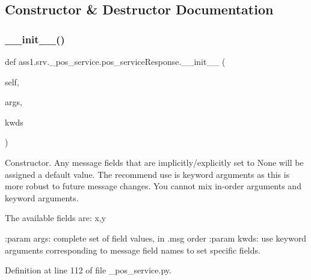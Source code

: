 \subsection{Constructor \& Destructor Documentation}
\mbox{\label{classass1_1_1srv_1_1__pos__service_1_1pos__serviceResponse_abaa31fbb2940ea320a46f5f31722656f}} 
\subsubsection{\texorpdfstring{\+\_\+\+\_\+init\+\_\+\+\_\+()}{\_\_init\_\_()}}
{\footnotesize\ttfamily def ass1.\+srv.\+\_\+pos\+\_\+service.\+pos\+\_\+service\+Response.\+\_\+\+\_\+init\+\_\+\+\_\+ (\begin{DoxyParamCaption}\item[{}]{self,  }\item[{}]{args,  }\item[{}]{kwds }\end{DoxyParamCaption})}

\begin{DoxyVerb}Constructor. Any message fields that are implicitly/explicitly
set to None will be assigned a default value. The recommend
use is keyword arguments as this is more robust to future message
changes.  You cannot mix in-order arguments and keyword arguments.

The available fields are:
   x,y

:param args: complete set of field values, in .msg order
:param kwds: use keyword arguments corresponding to message field names
to set specific fields.
\end{DoxyVerb}
 

Definition at line 112 of file \+\_\+pos\+\_\+service.\+py.


